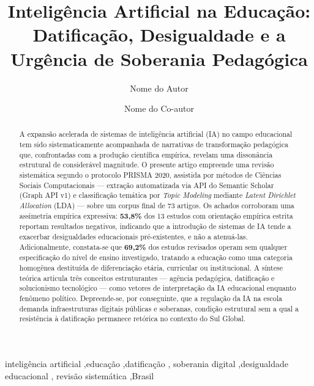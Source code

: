 \documentclass[preprint,12pt,authoryear]{elsarticle}
\begin{document}
\begin{frontmatter}

\title{Inteligência Artificial na Educação: Datificação,
       Desigualdade e a Urgência de Soberania Pedagógica}

\author[inst1]{Nome do Autor}
\author[inst2]{Nome do Co-autor}


\begin{abstract}
A expansão acelerada de sistemas de inteligência artificial (IA) no
campo educacional tem sido sistematicamente acompanhada de narrativas
de transformação pedagógica que, confrontadas com a produção científica
empírica, revelam uma dissonância estrutural de considerável magnitude.
O presente artigo empreende uma revisão sistemática segundo o protocolo
PRISMA 2020, assistida por métodos de Ciências Sociais Computacionais
— extração automatizada via API do Semantic Scholar (Graph API v1) e
classificação temática por \textit{Topic Modeling} mediante
\textit{Latent Dirichlet Allocation} (LDA) — sobre um corpus final de
73 artigos. Os achados corroboram uma assimetria empírica expressiva:
\textbf{53,8\%} dos 13 estudos com orientação empírica estrita reportam
resultados negativos, indicando que a introdução de sistemas de IA
tende a exacerbar desigualdades educacionais pré-existentes, e não a
atenuá-las. Adicionalmente, constata-se que \textbf{69,2\%} dos estudos
revisados operam sem qualquer especificação do nível de ensino
investigado, tratando a educação como uma categoria homogênea
destituída de diferenciação etária, curricular ou institucional.
A síntese teórica articula três conceitos estruturantes — agência
pedagógica, datificação e solucionismo tecnológico — como vetores
de interpretação da IA educacional enquanto fenômeno político.
Depreende-se, por conseguinte, que a regulação da IA na escola
demanda infraestruturas digitais públicas e soberanas, condição
estrutural sem a qual a resistência à datificação permanece retórica
no contexto do Sul Global.
\end{abstract}

\begin{keyword}
inteligência artificial \sep educação \sep datificação \sep
soberania digital \sep desigualdade educacional \sep
revisão sistemática \sep Brasil
\end{keyword}

\end{frontmatter}
\end{document}
